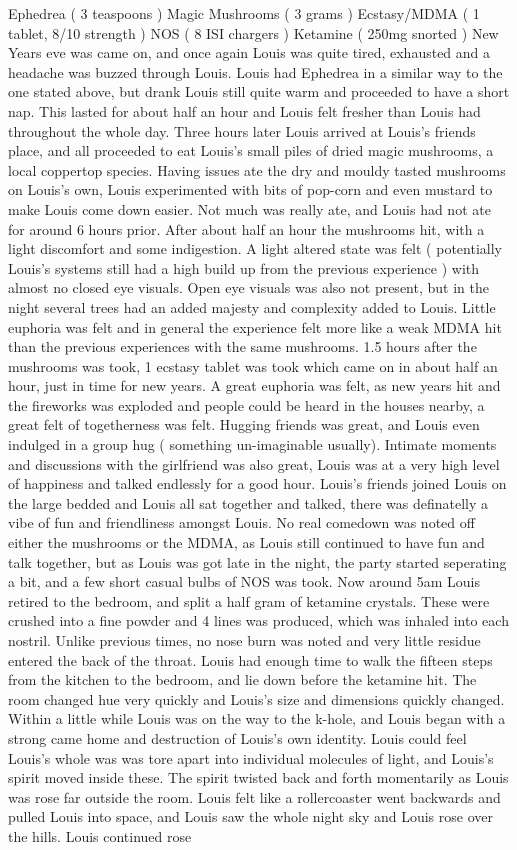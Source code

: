 \documentclass[12pt]{book}
\begin{document}
Ephedrea ( 3 teaspoons ) Magic Mushrooms ( 3 grams ) Ecstasy/MDMA ( 1 tablet, 8/10 strength ) NOS ( 8 ISI chargers ) Ketamine ( 250mg snorted ) New Years eve was came on, and once again Louis was quite tired, exhausted and a headache was buzzed through Louis. Louis had Ephedrea in a similar way to the one stated above, but drank Louis still quite warm and proceeded to have a short nap. This lasted for about half an hour and Louis felt fresher than Louis had throughout the whole day. Three hours later Louis arrived at Louis's friends place, and all proceeded to eat Louis's small piles of dried magic mushrooms, a local coppertop species. Having issues ate the dry and mouldy tasted mushrooms on Louis's own, Louis experimented with bits of pop-corn and even mustard to make Louis come down easier. Not much was really ate, and Louis had not ate for around 6 hours prior. After about half an hour the mushrooms hit, with a light discomfort and some indigestion. A light altered state was felt ( potentially Louis's systems still had a high build up from the previous experience ) with almost no closed eye visuals. Open eye visuals was also not present, but in the night several trees had an added majesty and complexity added to Louis. Little euphoria was felt and in general the experience felt more like a weak MDMA hit than the previous experiences with the same mushrooms. 1.5 hours after the mushrooms was took, 1 ecstasy tablet was took which came on in about half an hour, just in time for new years. A great euphoria was felt, as new years hit and the fireworks was exploded and people could be heard in the houses nearby, a great felt of togetherness was felt. Hugging friends was great, and Louis even indulged in a group hug ( something un-imaginable usually). Intimate moments and discussions with the girlfriend was also great, Louis was at a very high level of happiness and talked endlessly for a good hour. Louis's friends joined Louis on the large bedded and Louis all sat together and talked, there was definatelly a vibe of fun and friendliness amongst Louis. No real comedown was noted off either the mushrooms or the MDMA, as Louis still continued to have fun and talk together, but as Louis was got late in the night, the party started seperating a bit, and a few short casual bulbs of NOS was took. Now around 5am Louis retired to the bedroom, and split a half gram of ketamine crystals. These were crushed into a fine powder and 4 lines was produced, which was inhaled into each nostril. Unlike previous times, no nose burn was noted and very little residue entered the back of the throat. Louis had enough time to walk the fifteen steps from the kitchen to the bedroom, and lie down before the ketamine hit. The room changed hue very quickly and Louis's size and dimensions quickly changed. Within a little while Louis was on the way to the k-hole, and Louis began with a strong came home and destruction of Louis's own identity. Louis could feel Louis's whole was was tore apart into individual molecules of light, and Louis's spirit moved inside these. The spirit twisted back and forth momentarily as Louis was rose far outside the room. Louis felt like a rollercoaster went backwards and pulled Louis into space, and Louis saw the whole night sky and Louis rose over the hills. Louis continued rose 
\end{document}
